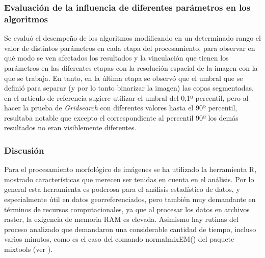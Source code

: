

\subsubsection{Evaluación de la influencia de diferentes parámetros en los algoritmos}
Se evaluó el desempeño de los algoritmos modificando en un determinado rango el valor de distintos parámetros en cada etapa del procesamiento, para observar en qué modo se ven afectados los resultados y la vinculación que tienen los parámetros en las diferentes etapas con la resolución espacial de la imagen con la que se trabaja. En tanto, en la última etapa se observó que el umbral
que se definió para separar (y por lo tanto binarizar la imagen) las copas segmentadas, en el artículo de referencia sugiere utilizar el umbral del 0,1º percentil, pero al hacer la prueba de \textit{Gridsearch} con diferentes valores hasta el 90º percentil, resultaba notable que excepto el correspondiente al percentil 90º los demás resultados no eran visiblemente
diferentes.

\subsubsection{Discusión}
Para el procesamiento morfológico de imágenes se ha utilizado la herramienta R, mostrado características que merecen ser tenidas en cuenta en el análisis. Por lo general esta herramienta es poderosa para el análisis estadístico de datos, y especialmente útil en datos georreferenciados, pero también muy demandante en términos de recursos computacionales, ya que al procesar los datos en archivos raster, la exigencia de memoria RAM es elevada. Asimismo hay rutinas del proceso analizado que demandaron una considerable cantidad de tiempo, incluso varios minutos, como es el caso del comando  normalmixEM() del paquete mixtools (ver \cite{young__aut_mixtools_2022}).



